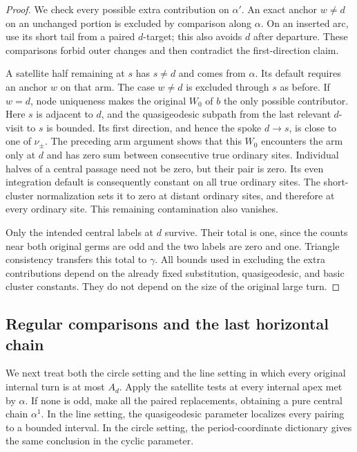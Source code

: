 \begin{proof}
We check every possible extra contribution on $\alpha'$. An exact anchor
$w\ne d$ on an unchanged portion is excluded by comparison along
$\alpha$. On an inserted arc, use its short tail from a paired $d$-target;
this also avoids $d$ after departure. These comparisons forbid outer
changes and then contradict the first-direction claim.

A satellite half remaining at $s$ has $s\ne d$ and comes from
$\alpha$. Its default requires an anchor $w$ on that arm. The case
$w\ne d$ is excluded through $s$ as before. If $w=d$, node uniqueness
makes the original $W_0$ of $b$ the only possible contributor. Here $s$ is
adjacent to $d$, and the quasigeodesic subpath from the last relevant
$d$-visit to $s$ is bounded. Its first direction, and hence the spoke
$d\to s$, is close to one of $\nu_\pm$. The preceding arm argument
shows that this $W_0$ encounters the arm only at $d$ and has zero sum
between consecutive true ordinary sites. Individual halves of a central
passage need not be zero, but their pair is zero. Its even integration
default is consequently constant on all true ordinary sites. The
short-cluster normalization sets it to zero at distant ordinary sites,
and therefore at every ordinary site. This remaining contamination also
vanishes.

Only the intended central labels at $d$ survive. Their total is one,
since the counts near both original germs are odd and the two labels are
zero and one. Triangle consistency transfers this total to $\gamma$.
All bounds used in excluding the extra contributions depend on the
already fixed substitution, quasigeodesic, and basic cluster constants.
They do not depend on the size of the original large turn.
\end{proof}

\subsection{Regular comparisons and the last horizontal chain}

We next treat both the circle setting and the line setting in which every
original internal turn is at most $A_d$. Apply the satellite tests at every
internal apex met by $\alpha$. If none is odd, make all the paired
replacements, obtaining a pure central chain $\alpha^1$. In the line
setting, the quasigeodesic parameter localizes every pairing to a bounded
interval. In the circle setting, the period-coordinate dictionary gives
the same conclusion in the cyclic parameter.

